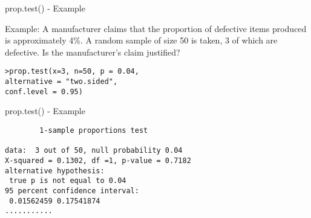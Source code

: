 \documentclass[pdf,default,slideColor,colorBG]{prosper}
\begin{document}
\begin{slide}{prop.test() - Example}


Example: A manufacturer claims that the proportion of
defective items produced is approximately 4\%. A random sample of
size 50 is taken, 3 of which are defective. Is the manufacturer's
claim justified?

\begin{verbatim}
>prop.test(x=3, n=50, p = 0.04,
alternative = "two.sided",
conf.level = 0.95)
\end{verbatim}
\end{slide}

\begin{slide}{prop.test() - Example}

\begin{verbatim}
        1-sample proportions test

data:  3 out of 50, null probability 0.04
X-squared = 0.1302, df =1, p-value = 0.7182
alternative hypothesis:
 true p is not equal to 0.04
95 percent confidence interval:
 0.01562459 0.17541874
...........
\end{verbatim}
\end{slide}
\end{document}
